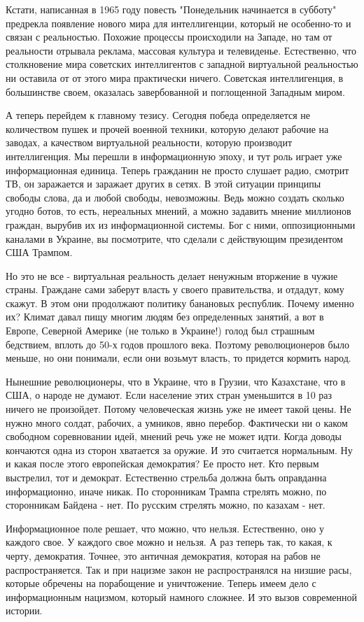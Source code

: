 Кстати, написанная в 1965 году повесть "Понедельник начинается в субботу"
предрекла появление нового мира для интеллигенции, который не особенно-то и
связан с реальностью. Похожие процессы происходили на Западе, но там от
реальности отрывала реклама, массовая культура и телевиденье. Естественно, что
столкновение мира советских интеллигентов с западной виртуальной реальностью ни
оставила от от этого мира практически ничего. Советская интеллигенция, в
большинстве своем, оказалась завербованной и поглощенной Западным миром.  

А теперь перейдем к главному тезису. Сегодня победа определяется не количеством
пушек и прочей военной техники, которую делают рабочие на заводах, а качеством
виртуальной реальности, которую производит интеллигенция. Мы перешли в
информационную эпоху, и тут роль играет уже информационная единица. Теперь
гражданин не просто слушает радио, смотрит ТВ, он заражается и заражает других
в сетях. В этой ситуации принципы свободы слова, да и любой свободы,
невозможны. Ведь можно создать сколько угодно ботов, то есть, нереальных
мнений, а можно задавить мнение миллионов граждан, вырубив их из информационной
системы. Бог с ними, оппозиционными каналами в Украине, вы посмотрите, что
сделали с действующим президентом США Трампом. 

Но это не все - виртуальная реальность делает ненужным вторжение в чужие
страны. Граждане сами заберут власть у своего правительства, и отдадут, кому
скажут. В этом они продолжают политику банановых республик. Почему именно их?
Климат давал пищу многим людям без определенных занятий, а вот в Европе,
Северной Америке (не только в Украине!) голод был страшным бедствием, вплоть до
50-х годов прошлого века.  Поэтому революционеров было меньше, но они понимали,
если они возьмут власть, то придется кормить народ. 

Нынешние революционеры, что в Украине, что в Грузии, что Казахстане, что в США,
о народе не думают. Если население этих стран уменьшится в 10 раз ничего не
произойдет. Потому человеческая жизнь уже не имеет такой цены. Не нужно много
солдат, рабочих, а умников, явно перебор. Фактически ни о каком свободном
соревновании идей, мнений речь уже не может идти. Когда доводы кончаются одна
из сторон хватается за оружие. И это считается нормальным. Ну и какая после
этого европейская демократия? Ее просто нет. Кто первым выстрелил, тот и
демократ. Естественно стрельба должна быть оправданна информационно, иначе
никак. По сторонникам Трампа стрелять можно, по сторонникам Байдена - нет. По
русским стрелять можно, по казахам - нет. 

Информационное поле решает, что можно, что нельзя. Естественно, оно у каждого
свое. У каждого свое можно и нельзя. А раз теперь так, то какая, к черту,
демократия. Точнее, это античная демократия, которая на рабов не
распространяется. Так и при нацизме закон не распространялся на низшие расы,
которые обречены на порабощение и уничтожение. Теперь имеем дело с
информационным нацизмом, который намного сложнее.  И это вызов современной
истории.

